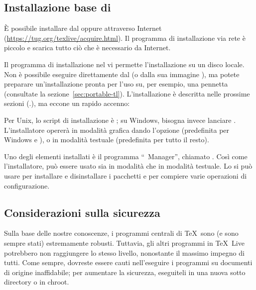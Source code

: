 \documentclass{article}
\begin{document}
\subsection{Installazione base di \protect\TL{}}
\label{sec:basic}

È possibile installare \TL{} dal \DVD{} oppure attraverso Internet
(\url{https://tug.org/texlive/acquire.html}). Il programma di installazione
via rete è piccolo e scarica tutto ciò che è necessario da Internet.

Il programma di installazione nel \DVD{} vi permette l'installazione su un
disco locale. Non è possibile eseguire \TL{} direttamente dal \DVD{} \TK{}
(o dalla sua immagine ), ma potete preparare un'installazione
pronta per l'uso su, per esempio, una pennetta \USB{} (consultate la
sezione~\ref{sec:portable-tl}). L'installazione è descritta nelle prossime
sezioni (\p.\pageref{sec:install}), ma eccone un rapido accenno:

\begin{itemize*}

\item Per Unix, lo script di installazione è ; su
  Windows, bisogna invece lanciare .
  L'installatore opererà in modalità grafica dando l'opzione
   (predefinita per Windows e \MacOSX), o in modalità testuale
   (predefinita per tutto il resto).

\item Uno degli elementi installati è il programma ``\TL\ Manager'',
  chiamato . Così come l'installatore, può essere usato sia in
  modalità \GUI{} che in modalità testuale. Lo si può usare per installare
  e disinstallare i pacchetti e per compiere varie operazioni di
  configurazione.

\end{itemize*}


\subsection{Considerazioni sulla sicurezza}
\label{sec:security}

Sulla base delle nostre conoscenze, i programmi centrali di \TeX\ sono (e
sono sempre stati) estremamente robusti. Tuttavia, gli altri programmi in
\TeX\ Live potrebbero non raggiungere lo stesso livello, nonostante il
massimo impegno di tutti. Come sempre, dovreste essere cauti
nell'eseguire i programmi su documenti di origine inaffidabile; per
aumentare la sicurezza, eseguiteli in una nuova sotto directory o in chroot.
\end{document}
